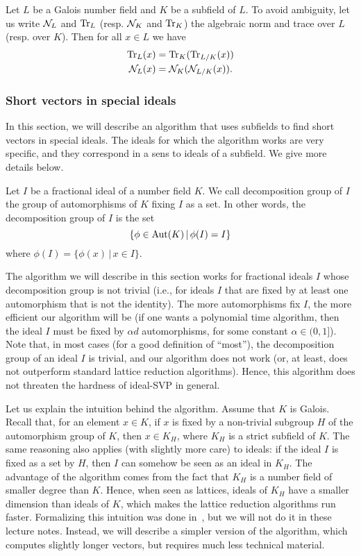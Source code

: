 \begin{lemma}
Let $L$ be a Galois number field and $K$ be a subfield of $L$. To avoid ambiguity, let us write $\mathcal{N}_L$ and $\mathrm{Tr}_L$ (resp. $\mathcal{N}_K$ and $\mathrm{Tr}_K$) the algebraic norm and trace over $L$ (resp. over $K$). Then for all $x \in L$ we have
\begin{align}
\label{eq:composing-relative-norm} \mathrm{Tr}_L(x) &= \mathrm{Tr}_K(\mathrm{Tr}_{L/K}(x)) \\
\mathcal{N}_L(x) &= \mathcal{N}_K(\mathcal{N}_{L/K}(x)).
\end{align}
\end{lemma}

\subsubsection{Short vectors in special ideals}
\label{sec:attack-ideal-SVP}

In this section, we will describe an algorithm that uses subfields to find short vectors in special ideals. The ideals for which the algorithm works are very specific, and they correspond in a sens to ideals of a subfield. We give more details below.

\begin{definition}
Let $I$ be a fractional ideal of a number field $K$. We call decomposition group of $I$ the group of automorphisms of $K$ fixing $I$ as a set. In other words, the decomposition group of $I$ is the set
\[ \{ \phi \in \operatorname{Aut}(K) \,|\, \phi(I) = I \}\]
where $\phi(I) = \{ \phi(x)\,|\, x \in I\}$.
\end{definition}

The algorithm we will describe in this section works for fractional ideals $I$ whose decomposition group is not trivial (i.e., for ideals $I$ that are fixed by at least one automorphism that is not the identity). The more automorphisms fix $I$, the more efficient our algorithm will be (if one wants a polynomial time algorithm, then the ideal $I$ must be fixed by $\alpha d$ automorphisms, for some constant $\alpha \in (0,1]$). Note that, in most cases (for a good definition of ``most''), the decomposition group of an ideal $I$ is trivial, and our algorithm does not work (or, at least, does not outperform standard lattice reduction algorithms). Hence, this algorithm does not threaten the hardness of ideal-SVP in general.

Let us explain the intuition behind the algorithm. Assume that $K$ is Galois. Recall that, for an element $x \in K$, if $x$ is fixed by a non-trivial subgroup $H$ of the automorphism group of $K$, then $x \in K_H$, where $K_H$ is a strict subfield of $K$. The same reasoning also applies (with slightly more care) to ideals: if the ideal $I$ is fixed as a set by $H$, then $I$ can somehow be seen as an ideal in $K_H$. The advantage of the algorithm comes from the fact that $K_H$ is a number field of smaller degree than $K$. Hence, when seen as lattices, ideals of $K_H$ have a smaller dimension than ideals of $K$, which makes the lattice reduction algorithms run faster.
Formalizing this intuition was done in~\cite{BGP22}, but we will not do it in these lecture notes. Instead, we will describe a simpler version of the algorithm, which computes slightly longer vectors, but requires much less technical material.

